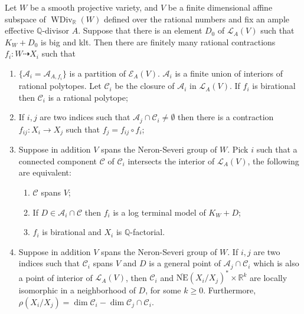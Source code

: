 \begin{theorem}\label{mapbetweenAM}
  \cite[Theorem 3.3]{haconSarkisovProgram2012} Let $W$ be a smooth projective   variety, and  $ V $ be a finite dimensional affine subspace of $ \operatorname{WDiv}_{\mathbb{R}}(W) $ defined over the rational numbers and fix an ample effective $\mathbb{Q}$-divisor $A$. Suppose that there is an element $D_{0}$ of $\mathcal{L}_{A}(V)$ such that $K_{W}+D_{0}$ is big and klt. Then there are finitely many rational contractions $ f_i:W\dashrightarrow X_i $ such that
  \begin{enumerate}
    \item $ \{\mathcal{A}_i=\mathcal{A}_{A,f_i}\} $ is a partition of $ \mathcal{E}_{A}(V) $. $ \mathcal{A}_{i} $ is a finite union of interiors of rational polytopes.  Let $\mathcal{C}_{i}$ be the closure of $\mathcal{A}_{i}$ in $\mathcal{L}_{A}(V)$. If $ f_i $ is birational then $ \mathcal{C}_i$ is a rational polytope;
    \item If $ i,j $ are two indices such that $ \mathcal{A}_j\cap \mathcal{C}_i\neq \emptyset $ then there is a contraction $ f_{ij}:X_i\to X_j $ such that $ f_j=f_{ij}\circ f_i $;
    \item Suppose in addition $ V $ spans the Neron-Severi group of $W$. Pick $ i $ such that a connected component $ \mathcal{C} $ of $ \mathcal{C}_i $ intersects the interior of $ \mathcal{L}_A(V) $, the following are equivalent:
          \begin{enumerate}
            \item $ \mathcal{C} $ spans $ V $;
            \item If $ D\in \mathcal{A}_i\cap \mathcal{C} $ then $ f_i $ is a log terminal model of $ K_W+D $;
            \item $ f_i $ is birational and $ X_i $ is $ \mathbb{Q} $-factorial.
          \end{enumerate}
    \item Suppose in addition $ V $ spans the Neron-Severi group of $W$. If $ i,j $ are two indices such that $ \mathcal{C}_i $ spans $ V $ and $ D $ is a general point of $ \mathcal{A}_j\cap \mathcal{C}_i $ which is also a point of interior of $ \mathcal{L}_A(V) $, then $ \mathcal{C}_i $ and $ \overline{\mathrm{NE}}(X_i/X_j)^*\times \mathbb{R}^k $ are locally isomorphic in a neighborhood of $D$,  for some $ k\geqslant 0 $. Furthermore, $ \rho(X_i/X_j)=\dim  \mathcal{C}_i-\dim \mathcal{C}_j\cap \mathcal{C}_i   $.
  \end{enumerate}
\end{theorem}

